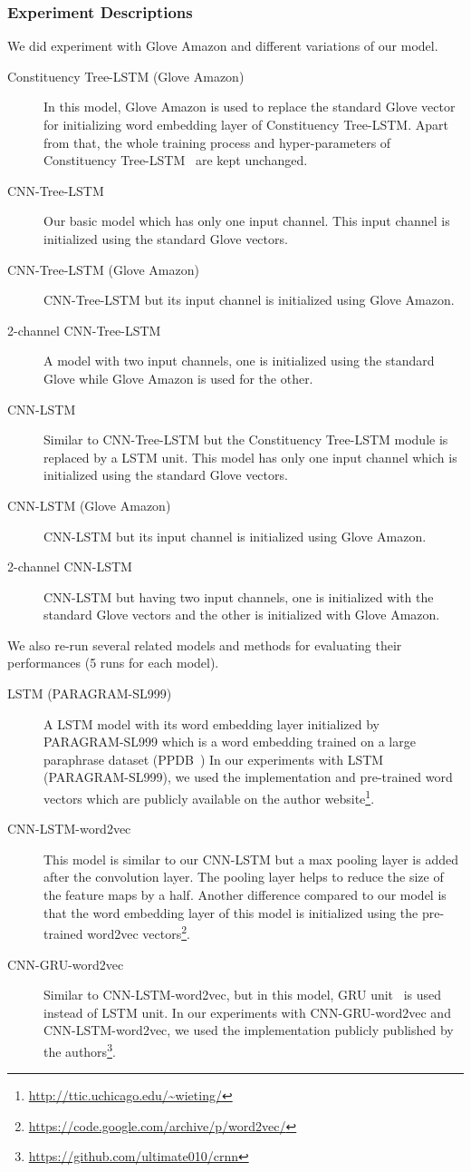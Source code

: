 \subsubsection{Experiment Descriptions}
We did experiment with Glove Amazon and different variations of our model.
\begin{description}
	\item[Constituency Tree-LSTM (Glove Amazon)] In this model, Glove Amazon is used to replace the standard Glove vector for initializing word embedding layer of Constituency Tree-LSTM.
	Apart from that, the whole training process and hyper-parameters of Constituency Tree-LSTM~\cite{treeLSTM} are kept unchanged.
	\item[CNN-Tree-LSTM] Our basic model which has only one input channel. 
	This input channel is initialized using the standard Glove vectors.
	\item[CNN-Tree-LSTM (Glove Amazon)] CNN-Tree-LSTM but its input channel is initialized using Glove Amazon.
	\item [2-channel CNN-Tree-LSTM] A model with two input channels, one is initialized using the standard Glove while Glove Amazon is used for the other.
	\item[CNN-LSTM] Similar to CNN-Tree-LSTM but the Constituency Tree-LSTM module is replaced by a LSTM unit.
	This model has only one input channel which is initialized using the standard Glove vectors.
	\item [CNN-LSTM (Glove Amazon)] CNN-LSTM but its input channel is initialized using Glove Amazon.
	\item [2-channel CNN-LSTM] CNN-LSTM but having two input channels, one is initialized with the standard Glove vectors and the other is initialized with Glove Amazon.
\end{description}
We also re-run several related models and methods for evaluating their performances (5 runs for each model).
\begin{description}
	\item[LSTM (PARAGRAM-SL999)~\cite{wieting2015towards}] A LSTM model with its word embedding layer initialized by PARAGRAM-SL999 which is a word embedding trained on a large paraphrase dataset (PPDB~\cite{ganitkevitch2013ppdb})
	In our experiments with LSTM (PARAGRAM-SL999), we used the implementation and pre-trained word vectors which are publicly available on the author website\footnote{\url{http://ttic.uchicago.edu/~wieting/}}.
	\item [CNN-LSTM-word2vec~\cite{cnn-rnn}] This model is similar to our CNN-LSTM but a max pooling layer is added after the convolution layer.  
	The pooling layer helps to reduce the size of the feature maps by a half.
	Another difference compared to our model is that the word embedding layer of this model is initialized using the pre-trained word2vec vectors\footnote{\url{https://code.google.com/archive/p/word2vec/}}.
	\item [CNN-GRU-word2vec~\cite{cnn-rnn}] Similar to CNN-LSTM-word2vec, but in this model, GRU unit~\cite{gru} is used instead of LSTM unit.
	In our experiments with CNN-GRU-word2vec and CNN-LSTM-word2vec, we used the implementation publicly published by the authors\footnote{\url{https://github.com/ultimate010/crnn}}.
\end{description}
